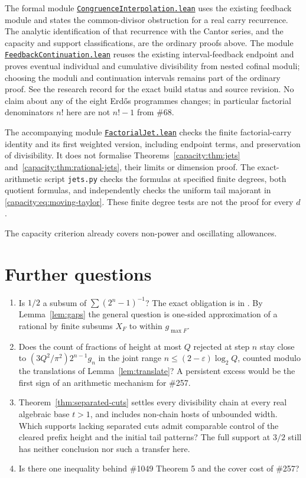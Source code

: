 \documentclass[11pt]{article}
\begin{document}
The formal module
\href{\repobase/lean/ErdosProblems/Synthesis/CongruenceInterpolation.lean}{\texttt{CongruenceInterpolation.lean}}
uses the existing feedback module and states the common-divisor obstruction
for a real carry recurrence. The analytic identification of that recurrence
with the Cantor series, and the capacity and support classifications, are
the ordinary proofs above. The module
\href{\repobase/lean/ErdosProblems/Synthesis/FeedbackContinuation.lean}{\texttt{FeedbackContinuation.lean}}
reuses the existing interval-feedback endpoint and proves eventual individual
and cumulative divisibility from nested cofinal moduli; choosing the moduli
and continuation intervals remains part of the ordinary proof. See the research record for the exact build status and source
revision. No claim about any of the eight Erd\H{o}s programmes changes;
in particular factorial denominators $n!$ here are not $n!-1$ from \#68.


The accompanying module
\href{https://github.com/wcook04/plectis-erdos/blob/2bd14835b940b3c695a9cc8828c7e2967d65c053/lean/ErdosProblems/Synthesis/FactorialJet.lean}{\texttt{FactorialJet.lean}}
checks the finite
factorial-carry identity and its first weighted version, including endpoint
terms, and preservation of divisibility. It does not formalise
Theorems~\ref{capacity:thm:jets} and~\ref{capacity:thm:rational-jets}, their
limits or dimension proof. The
exact-arithmetic script \texttt{jets.py} checks the formulas at specified
finite degrees, both quotient formulas, and independently checks the uniform tail majorant in
\eqref{capacity:eq:moving-taylor}. These finite degree tests are not the
proof for every $d$.

The capacity criterion already covers non-power and oscillating allowances.
\section{Further questions}\label{sec:questions}


\begin{enumerate}
\item Is $1/2$ a subsum of $\sum(2^n-1)^{-1}$?  The exact obligation is in
  \cite[Theorem~7]{plectis257}.  By Lemma~\ref{lem:gaps} the general question is
  one-sided approximation of a rational by finite subsums $X_F$ to within
  $g_{\max F}$.
\item Does the count of fractions of height at most $Q$ rejected at step $n$
  stay close to $(3Q^2/\pi^2)2^{n-1}g_n$ in the joint range
  $n\le(2-\varepsilon)\log_2Q$, counted modulo the translations of
  Lemma~\ref{lem:translate}?  A persistent excess would be the first sign of an
  arithmetic mechanism for \#257.
\item Theorem~\ref{thm:separated-cuts} settles every divisibility chain at
  every real algebraic base $t>1$, and includes non-chain hosts of unbounded
  width. Which supports lacking separated cuts admit comparable control of
  the cleared prefix height and the initial tail patterns? The full support
  at $3/2$ still has neither conclusion nor such a transfer here.
\item Is there one inequality behind \#1049 Theorem 5 and the cover cost of
  \#257?
\end{enumerate}
\end{document}
